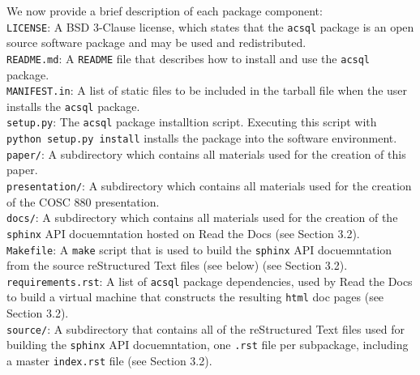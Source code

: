 \documentclass[10pt,journal,compsoc]{IEEEtran}
\begin{document}
We now provide a brief description of each package component:\\

\noindent\texttt{LICENSE}: A BSD 3-Clause license, which states that the \texttt{acsql} package is an open source software package
and may be used and redistributed.\\

\noindent\texttt{README.md}: A \texttt{README} file that describes how to install and use the \texttt{acsql} package.\\

\noindent\texttt{MANIFEST.in}: A list of static files to be included in the tarball file when the user installs the
\noindent\texttt{acsql} package.\\

\noindent\texttt{setup.py}: The \texttt{acsql} package installtion script.  Executing this script with \texttt{python setup.py install}
installs the package into the software environment.\\

\noindent\texttt{paper/}: A subdirectory which contains all materials used for the creation of this paper.\\

\noindent\texttt{presentation/}: A subdirectory which contains all materials used for the creation of the COSC 880 presentation.\\

\noindent\texttt{docs/}: A subdirectory which contains all materials used for the creation of the \texttt{sphinx} API docuemntation
hosted on Read the Docs (see Section 3.2).\\

\noindent\texttt{Makefile}: A \texttt{make} script that is used to build the \texttt{sphinx} API docuemntation from the source
reStructured Text files (see below) (see Section 3.2).\\

\noindent\texttt{requirements.rst}: A list of \texttt{acsql} package dependencies, used by Read the Docs to build a virtual
machine that constructs the resulting \texttt{html} doc pages (see Section 3.2).\\

\noindent\texttt{source/}: A subdirectory that contains all of the reStructured Text files used for building the \texttt{sphinx}
API docuemntation, one \texttt{.rst} file per subpackage, including a master \texttt{index.rst} file (see Section 3.2).\\
\end{document}
